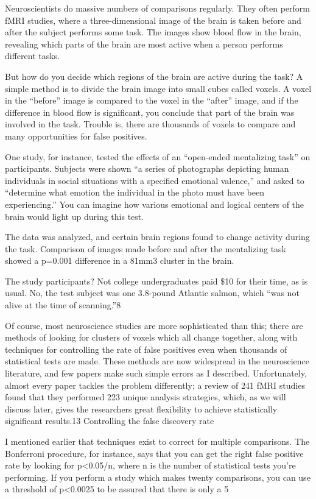 Neuroscientists do massive numbers of comparisons regularly. They often perform fMRI studies, where a three-dimensional image of the brain is taken before and after the subject performs some task. The images show blood flow in the brain, revealing which parts of the brain are most active when a person performs different tasks.

But how do you decide which regions of the brain are active during the task? A simple method is to divide the brain image into small cubes called voxels. A voxel in the “before” image is compared to the voxel in the “after” image, and if the difference in blood flow is significant, you conclude that part of the brain was involved in the task. Trouble is, there are thousands of voxels to compare and many opportunities for false positives.

One study, for instance, tested the effects of an “open-ended mentalizing task” on participants. Subjects were shown “a series of photographs depicting human individuals in social situations with a specified emotional valence,” and asked to “determine what emotion the individual in the photo must have been experiencing.” You can imagine how various emotional and logical centers of the brain would light up during this test.

The data was analyzed, and certain brain regions found to change activity during the task. Comparison of images made before and after the mentalizing task showed a p=0.001 difference in a 81mm3 cluster in the brain.

The study participants? Not college undergraduates paid \$10 for their time, as is usual. No, the test subject was one 3.8-pound Atlantic salmon, which “was not alive at the time of scanning.”8

Of course, most neuroscience studies are more sophisticated than this; there are methods of looking for clusters of voxels which all change together, along with techniques for controlling the rate of false positives even when thousands of statistical tests are made. These methods are now widespread in the neuroscience literature, and few papers make such simple errors as I described. Unfortunately, almost every paper tackles the problem differently; a review of 241 fMRI studies found that they performed 223 unique analysis strategies, which, as we will discuss later, gives the researchers great flexibility to achieve statistically significant results.13
Controlling the false discovery rate

I mentioned earlier that techniques exist to correct for multiple comparisons. The Bonferroni procedure, for instance, says that you can get the right false positive rate by looking for p<0.05/n, where n is the number of statistical tests you’re performing. If you perform a study which makes twenty comparisons, you can use a threshold of p<0.0025 to be assured that there is only a 5%

